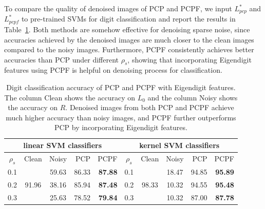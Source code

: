 \documentclass[twoside,11pt]{article}
\def\realL{L_0}
\def\optL{L^*}
\begin{document}
To compare the quality of denoised images of PCP and PCPF, we input
$\optL_{pcp}$ and $\optL_{pcpf}$ to pre-trained SVMs for digit classification
and report the results in Table~\ref{tab:digit_classification}.
Both methods are somehow effective for denoising sparse noise, since accuracies achieved by
the denoised images are much closer to the clean images compared to the noisy images.
Furthermore, PCPF consistently achieves better accuracies than PCP under different
$\rho_s$, showing that incorporating Eigendigit features using PCPF is helpful on
denoising process for classification.

\begin{table}
  \centering
  \begin{tabular}{c|c|c|rr||c|c|c|rr}
    \multicolumn{5}{c}{linear SVM classifiers}&
    \multicolumn{5}{c}{kernel SVM classifiers}\\
    \hline
    $\rho_s$ & Clean & Noisy & PCP & PCPF &
    $\rho_s$ & Clean & Noisy & PCP & PCPF \\ \hline
    0.1 & \multirow{3}{*}{91.96}& 59.63 & 86.33 & {\bf 87.88} &
    0.1 & \multirow{3}{*}{98.33}& 18.47 & 94.85 & {\bf 95.89} \\
    0.2 & & 38.16 & 85.94 & {\bf 87.48} &
    0.2 & & 10.32 & 94.55 & {\bf 95.48} \\
    0.3 & & 25.63 & 78.52 & {\bf 79.84} &
    0.3 & & 10.32 & 87.00 & {\bf 87.78} \\
  \end{tabular}
  \caption{Digit classification accuracy of PCP and PCPF with Eigendigit features.
    The column Clean shows
    the accuracy on $\realL$ and the column Noisy shows the accuracy on $R$.
    Denoised images from both PCP and PCPF achieve much higher accuracy than noisy images,
    and PCPF further outperforms PCP by incorporating Eigendigit features.}
  \label{tab:digit_classification}
\end{table}
\end{document}
